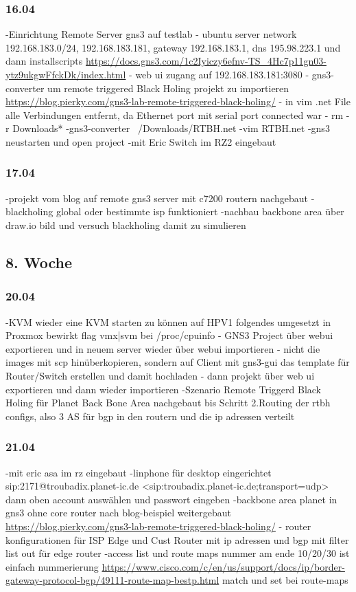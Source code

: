 \documentclass[english,runningheads,a4paper]{llncs}[2018/03/10]
\begin{document}
\subsubsection{16.04}
-Einrichtung Remote Server gns3 auf testlab
- ubuntu server network 192.168.183.0/24, 192.168.183.181, gateway 192.168.183.1, dns 195.98.223.1 und dann installscripts \url{https://docs.gns3.com/1c2Iyiczy6efnv-TS_4Hc7p11gn03-ytz9ukgwFfckDk/index.html}
- web ui zugang auf 192.168.183.181:3080
- gns3-converter um remote triggered Black Holing projekt zu importieren
\url{https://blog.pierky.com/gns3-lab-remote-triggered-black-holing/}
- in vim .net File alle Verbindungen entfernt, da Ethernet port mit serial port connected war
- rm -r Downloads*
-gns3-converter ~/Downloads/RTBH.net
-vim RTBH.net
-gns3 neustarten und open project
-mit Eric Switch im RZ2 eingebaut
\subsubsection{17.04}
-projekt vom blog auf remote gns3 server mit c7200 routern nachgebaut
- blackholing global oder bestimmte isp funktioniert
-nachbau backbone area über draw.io bild und versuch blackholing damit zu simulieren

\subsection{8. Woche}
\subsubsection{20.04}
-KVM wieder eine KVM starten zu können auf HPV1 folgendes umgesetzt in Proxmox bewirkt flag vmx|svm bei /proc/cpuinfo
- GNS3 Project über webui exportieren und in neuem server wieder über webui importieren
- nicht die images mit scp hinüberkopieren, sondern auf Client mit gns3-gui das template für Router/Switch erstellen und damit hochladen
- dann projekt über web ui exportieren und dann wieder importieren
-Szenario Remote Triggerd Black Holing für Planet Back Bone Area nachgebaut bis Schritt 2.Routing der rtbh configs, also 3 AS für bgp in den routern und die ip adressen verteilt
\subsubsection{21.04}
-mit eric asa im rz eingebaut
-linphone für desktop eingerichtet sip:2171@troubadix.planet-ic.de <sip:troubadix.planet-ic.de;transport=udp> dann oben account auswählen und passwort eingeben
-backbone area planet in gns3 ohne core router nach blog-beispiel weitergebaut \url{https://blog.pierky.com/gns3-lab-remote-triggered-black-holing/}
- router konfigurationen für ISP Edge und Cust Router mit ip adressen und bgp mit filter list out für edge router
-access list und route maps nummer am ende 10/20/30 ist einfach nummerierung \url{https://www.cisco.com/c/en/us/support/docs/ip/border-gateway-protocol-bgp/49111-route-map-bestp.html} match und set bei route-maps
\end{document}
